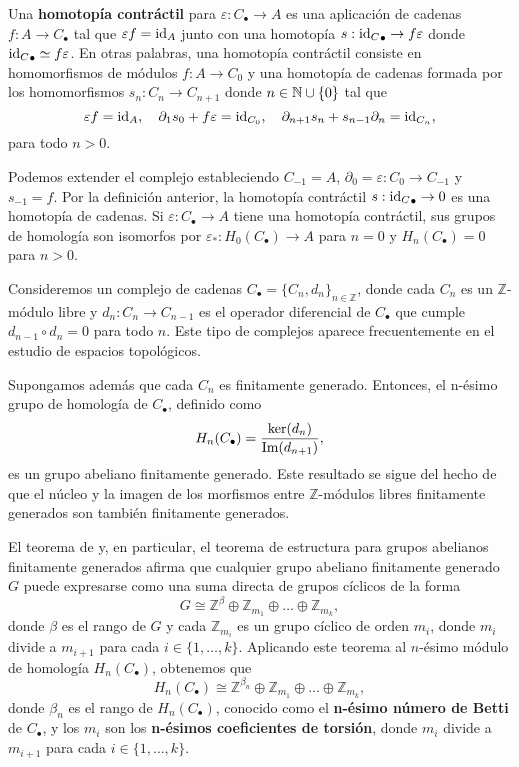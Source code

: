 \begin{definicion}
	\label{def:contr_homotopy} Una \textbf{homotopía contráctil} para
	$\varepsilon: C_{\bullet}\to A$ es una aplicación de cadenas
	$f: A \to C_{\bullet}$ tal que $\varepsilon f = \operatorname{id}_{A}$ junto con una
	homotopía $s:{\operatorname{id}_C}_{\bullet}\rightarrow f \varepsilon$ donde
	${\operatorname{id}_C}_{\bullet}\simeq f \varepsilon$. En otras palabras, una homotopía
	contráctil consiste en homomorfismos de módulos $f: A \to C_{0}$ y una
	homotopía de cadenas formada por los homomorfismos $s_{n}: C_{n}\to C_{n+1}$
	donde $n \in \mathbb{N} \cup \{0\}$ tal que
	\[
	\varepsilon f = \operatorname{id}_{A}, \quad \partial_{1}s_{0}+ f \varepsilon = \operatorname{id}_{C_0},
	\quad \partial_{n+1}s_{n}+ s_{n-1}\partial_{n}= \operatorname{id}_{C_n},
	\]
	para todo $n > 0$.
\end{definicion}

Podemos extender el complejo estableciendo $C_{-1}= A$, $\partial_{0}= \varepsilon
: C_{0}\to C_{-1}$ y $s_{-1}= f$. Por la definición anterior, la homotopía contráctil
$s:{\operatorname{id}_C}_{\bullet}\rightarrow 0$ es una homotopía de cadenas. Si
$\varepsilon: C_{\bullet}\to A$ tiene una homotopía contráctil, sus grupos de homología
son isomorfos por $\varepsilon_{*}: H_{0}(C_{\bullet}) \rightarrow A$ para $n = 0$
y $H_{n}(C_{\bullet}) = 0$ para $n > 0$.

Consideremos un complejo de cadenas $C_{\bullet}= \{ C_{n}, d_{n}\}_{n \in
	\mathbb{Z}}$, donde cada $C_{n}$ es un $\mathbb{Z}$-módulo libre y
$d_{n}: C_{n}\to C_{n-1}$ es el operador diferencial de $C_{\bullet}$ que cumple
$d_{n-1}\circ d_{n}= 0$ para todo $n$. Este tipo de complejos aparece frecuentemente
en el estudio de espacios topológicos.

Supongamos además que cada $C_{n}$ es finitamente generado. Entonces, el n-ésimo
grupo de homología de $C_{\bullet}$, definido como
\[
H_{n}(C_{\bullet}) = \frac{\ker(d_{n})}{\operatorname{Im}(d_{n+1})},
\]
es un grupo abeliano finitamente generado. Este resultado se sigue del hecho de que
el núcleo y la imagen de los morfismos entre $\mathbb{Z}$-módulos libres finitamente
generados son también finitamente generados.

El teorema de  y, en particular, el teorema de
estructura para grupos abelianos finitamente generados afirma que cualquier
grupo abeliano finitamente generado $G$ puede expresarse como una suma directa
de grupos cíclicos de la forma
\[
G \cong \mathbb{Z}^{\beta}\oplus \mathbb{Z}_{m_1}\oplus \ldots \oplus \mathbb{Z}
_{m_k},
\]
donde $\beta$ es el rango de $G$ y cada $\mathbb{Z}_{m_i}$ es un grupo cíclico
de orden $m_{i}$, donde $m_{i}$ divide a $m_{i+1}$ para cada $i \in \{1, \ldots,
k\}$. Aplicando este teorema al $n$-ésimo módulo de homología
$H_{n}(C_{\bullet})$, obtenemos que
\[
H_{n}(C_{\bullet}) \cong \mathbb{Z}^{\beta_n}\oplus \mathbb{Z}_{m_1}\oplus \ldots
\oplus \mathbb{Z}_{m_k},
\]
donde $\beta_{n}$ es el rango de $H_{n}(C_{\bullet})$, conocido como el \textbf{n-ésimo
	número de Betti} de $C_{\bullet}$, y los $m_{i}$ son los \textbf{n-ésimos
	coeficientes de torsión}, donde $m_{i}$ divide a $m_{i+1}$ para cada
$i \in \{1, \ldots, k\}$.

